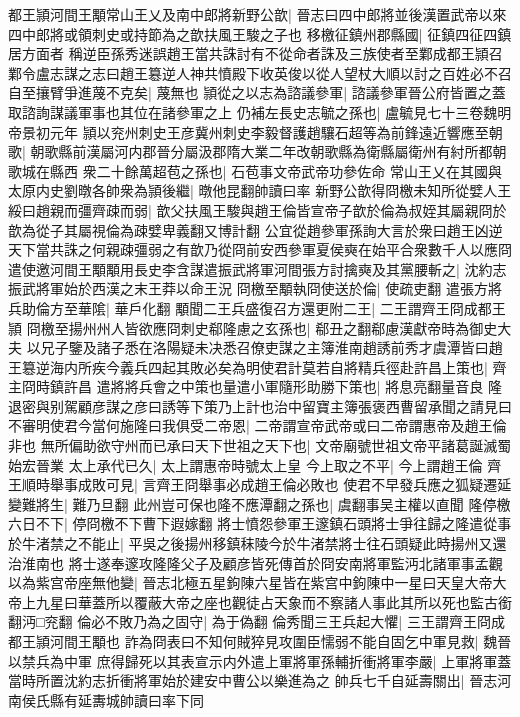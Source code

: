 都王頴河間王顒常山王乂及南中郎將新野公歆|{
	晉志曰四中郎將並後漢置武帝以來四中郎將或領刺史或持節為之歆扶風王駿之子也}
移檄征鎮州郡縣國|{
	征鎮四征四鎮居方面者}
稱逆臣孫秀迷誤趙王當共誅討有不從命者誅及三族使者至鄴成都王頴召鄴令盧志謀之志曰趙王簒逆人神共憤殿下收英俊以從人望杖大順以討之百姓必不召自至攘臂爭進蔑不克矣|{
	蔑無也}
頴從之以志為諮議參軍|{
	諮議參軍晉公府皆置之蓋取諮詢謀議軍事也其位在諸參軍之上}
仍補左長史志毓之孫也|{
	盧毓見七十三卷魏明帝景初元年}
頴以兖州刺史王彦冀州刺史李毅督護趙驤石超等為前鋒遠近響應至朝歌|{
	朝歌縣前漢屬河内郡晉分屬汲郡隋大業二年改朝歌縣為衛縣屬衛州有紂所都朝歌城在縣西}
衆二十餘萬超苞之孫也|{
	石苞事文帝武帝功參佐命}
常山王乂在其國與太原内史劉暾各帥衆為頴後繼|{
	暾他昆翻帥讀曰率}
新野公歆得冏檄未知所從嬖人王綏曰趙親而彊齊疎而弱|{
	歆父扶風王駿與趙王倫皆宣帝子歆於倫為叔姪其屬親冏於歆為從子其屬視倫為疎嬖卑義翻又博計翻}
公宜從趙參軍孫詢大言於衆曰趙王凶逆天下當共誅之何親疎彊弱之有歆乃從冏前安西參軍夏侯奭在始平合衆數千人以應冏遣使邀河間王顒顒用長史李含謀遣振武將軍河間張方討擒奭及其黨腰斬之|{
	沈約志振武將軍始於西漢之末王莽以命王況}
冏檄至顒執冏使送於倫|{
	使疏吏翻}
遣張方將兵助倫方至華隂|{
	華戶化翻}
顒聞二王兵盛復召方還更附二王|{
	二王謂齊王冏成都王頴}
冏檄至揚州州人皆欲應冏刺史郗隆慮之玄孫也|{
	郗丑之翻郗慮漢獻帝時為御史大夫}
以兄子鑒及諸子悉在洛陽疑未决悉召僚吏謀之主簿淮南趙誘前秀才虞潭皆曰趙王簒逆海内所疾今義兵四起其敗必矣為明使君計莫若自將精兵徑赴許昌上策也|{
	齊主冏時鎮許昌}
遣將將兵會之中策也量遣小軍隨形助勝下策也|{
	將息亮翻量音良}
隆退密與别駕顧彦謀之彦曰誘等下策乃上計也治中留寶主簿張褒西曹留承聞之請見曰不審明使君今當何施隆曰我俱受二帝恩|{
	二帝謂宣帝武帝或曰二帝謂惠帝及趙王倫非也}
無所偏助欲守州而已承曰天下世祖之天下也|{
	文帝廟號世祖文帝平諸葛誕滅蜀始宏晉業}
太上承代已久|{
	太上謂惠帝時號太上皇}
今上取之不平|{
	今上謂趙王倫}
齊王順時舉事成敗可見|{
	言齊王冏舉事必成趙王倫必敗也}
使君不早發兵應之狐疑遷延變難將生|{
	難乃旦翻}
此州豈可保也隆不應潭翻之孫也|{
	虞翻事吴主權以直聞}
隆停檄六日不下|{
	停冏檄不下曹下遐嫁翻}
將士憤怨參軍王邃鎮石頭將士爭往歸之隆遣從事於牛渚禁之不能止|{
	平吳之後揚州移鎮秣陵今於牛渚禁將士往石頭疑此時揚州又還治淮南也}
將士遂奉邃攻隆隆父子及顧彦皆死傳首於冏安南將軍監沔北諸軍事孟觀以為紫宫帝座無他變|{
	晉志北極五星鉤陳六星皆在紫宫中鉤陳中一星曰天皇大帝大帝上九星曰華蓋所以覆蔽大帝之座也觀徒占天象而不察諸人事此其所以死也監古銜翻沔□兖翻}
倫必不敗乃為之固守|{
	為于偽翻}
倫秀聞三王兵起大懼|{
	三王謂齊王冏成都王頴河間王顒也}
詐為冏表曰不知何賊猝見攻圍臣懦弱不能自固乞中軍見救|{
	魏晉以禁兵為中軍}
庶得歸死以其表宣示内外遣上軍將軍孫輔折衝將軍李嚴|{
	上軍將軍蓋當時所置沈約志折衝將軍始於建安中曹公以樂進為之}
帥兵七千自延壽關出|{
	晉志河南侯氏縣有延夀城帥讀曰率下同}
